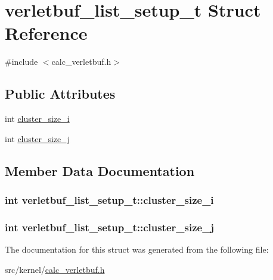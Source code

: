 \hypertarget{structverletbuf__list__setup__t}{\section{verletbuf\-\_\-list\-\_\-setup\-\_\-t \-Struct \-Reference}
\label{structverletbuf__list__setup__t}
}


{\ttfamily \#include $<$calc\-\_\-verletbuf.\-h$>$}

\subsection*{\-Public \-Attributes}
\begin{DoxyCompactItemize}
\item 
int \hyperlink{structverletbuf__list__setup__t_a61855b05724c90aa1676617ca944ac36}{cluster\-\_\-size\-\_\-i}
\item 
int \hyperlink{structverletbuf__list__setup__t_ae6965d404264e8fdcca936d376cb2952}{cluster\-\_\-size\-\_\-j}
\end{DoxyCompactItemize}


\subsection{\-Member \-Data \-Documentation}
\hypertarget{structverletbuf__list__setup__t_a61855b05724c90aa1676617ca944ac36}{
\subsubsection[{cluster\-\_\-size\-\_\-i}]{\setlength{\rightskip}{0pt plus 5cm}int {\bf verletbuf\-\_\-list\-\_\-setup\-\_\-t\-::cluster\-\_\-size\-\_\-i}}}\label{structverletbuf__list__setup__t_a61855b05724c90aa1676617ca944ac36}
\hypertarget{structverletbuf__list__setup__t_ae6965d404264e8fdcca936d376cb2952}{
\subsubsection[{cluster\-\_\-size\-\_\-j}]{\setlength{\rightskip}{0pt plus 5cm}int {\bf verletbuf\-\_\-list\-\_\-setup\-\_\-t\-::cluster\-\_\-size\-\_\-j}}}\label{structverletbuf__list__setup__t_ae6965d404264e8fdcca936d376cb2952}


\-The documentation for this struct was generated from the following file\-:\begin{DoxyCompactItemize}
\item 
src/kernel/\hyperlink{calc__verletbuf_8h}{calc\-\_\-verletbuf.\-h}\end{DoxyCompactItemize}
